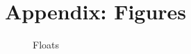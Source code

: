 \documentclass[12pt,fleqn]{article}
\begin{document}
\section{Appendix: Figures}
\begin{figure}[H]
	
	\centering
	\caption{Floats}
	\label{fig:2dtrajects}
\end{figure}
\end{document}
